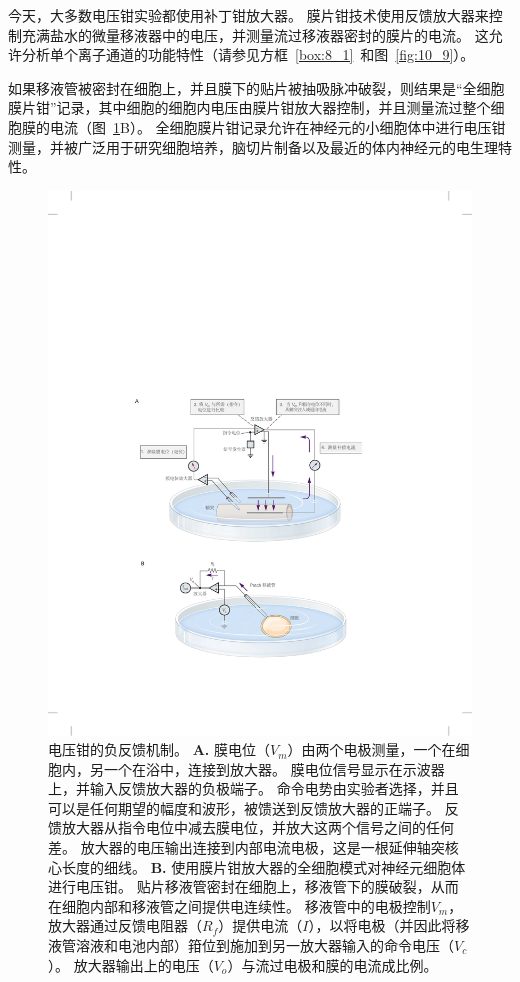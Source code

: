 \begin{proposition}[电压钳技术]
	\quad \quad 今天，大多数电压钳实验都使用补丁钳放大器。
	膜片钳技术使用反馈放大器来控制充满盐水的微量移液器中的电压，并测量流过移液器密封的膜片的电流。
	这允许分析单个离子通道的功能特性（请参见方框~\ref{box:8_1}~和图~\ref{fig:10_9}）。
	
	\quad \quad 如果移液管被密封在细胞上，并且膜下的贴片被抽吸脉冲破裂，则结果是“全细胞膜片钳”记录，其中细胞的细胞内电压由膜片钳放大器控制，并且测量流过整个细胞膜的电流（图~\ref{fig:10_2}B）。
	全细胞膜片钳记录允许在神经元的小细胞体中进行电压钳测量，并被广泛用于研究细胞培养，脑切片制备以及最近的体内神经元的电生理特性。
	
\end{proposition}



\begin{figure}[htbp]
	\centering
	\includegraphics[width=0.8\linewidth]{chap10/fig_10_2}
	\caption{电压钳的负反馈机制。
	\textbf{A. }膜电位（$V_m$）由两个电极测量，一个在细胞内，另一个在浴中，连接到放大器。
	膜电位信号显示在示波器上，并输入反馈放大器的负极端子。
	命令电势由实验者选择，并且可以是任何期望的幅度和波形，被馈送到反馈放大器的正端子。
	反馈放大器从指令电位中减去膜电位，并放大这两个信号之间的任何差。
	放大器的电压输出连接到内部电流电极，这是一根延伸轴突核心长度的细线。
	\textbf{B. }使用膜片钳放大器的全细胞模式对神经元细胞体进行电压钳。
	贴片移液管密封在细胞上，移液管下的膜破裂，从而在细胞内部和移液管之间提供电连续性。
	移液管中的电极控制$V_m$，放大器通过反馈电阻器（$R_f$）提供电流（$I$），以将电极（并因此将移液管溶液和电池内部）箝位到施加到另一放大器输入的命令电压（$V_c$）。
	放大器输出上的电压（$V_o$）与流过电极和膜的电流成比例。}
	\label{fig:10_2}
\end{figure}



